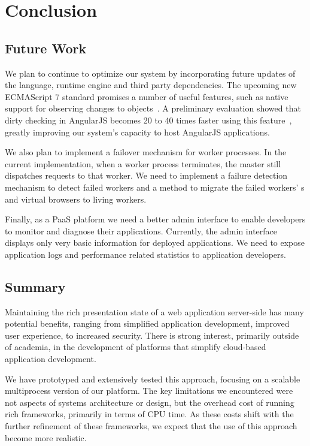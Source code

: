 \chapter{Conclusion}

\section{Future Work}

We plan to continue to optimize our system by incorporating future updates of
the \js language, \js runtime engine and third party dependencies. The upcoming
new ECMAScript 7 standard promises a number of useful features, such as native
support for observing changes to objects~\cite{jsobserveprop}. A preliminary evaluation
showed that dirty checking in AngularJS becomes 20 to 40 times faster using this
feature~\cite{angularjsspeedup}, greatly improving our system's
capacity to host AngularJS applications.



We also plan to implement a failover mechanism for   worker processes.  In
the current implementation, when a worker process terminates,  the master still
dispatches requests to that worker. We need to implement a failure detection
mechanism to detect failed workers and a method to migrate the failed workers'
\appins{}s and virtual browsers to living workers.


Finally, as a PaaS platform we need a better admin interface
to enable developers to monitor and diagnose their applications.
Currently, the admin interface displays only very basic information for deployed
applications. We need to expose application logs
and performance related statistics to application developers.

\section{Summary}

Maintaining the rich presentation state  of a web application server-side has
many potential benefits, ranging from simplified application development,
improved user experience, to increased security.  There is strong interest,
primarily outside of academia, in the development of platforms that simplify
cloud-based  application development.

We have prototyped and extensively tested this approach, focusing on a
scalable multiprocess version of our \cb{} platform. The key limitations we
encountered were not aspects of systems architecture or design,  but the
overhead cost of running rich frameworks, primarily in terms of CPU time.   As
these costs shift with the further refinement of these frameworks, we expect
that the use of this approach become more realistic.

